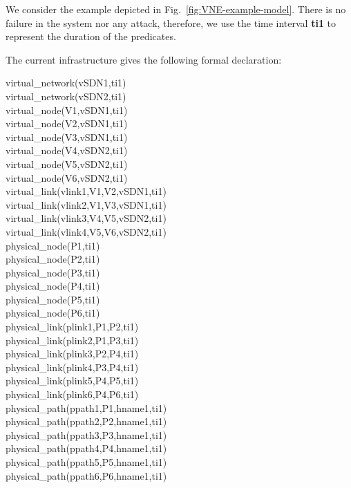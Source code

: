 We consider the example depicted in Fig.~\ref{fig:VNE-example-model}.
There is no failure in the system nor any attack, therefore, we use the time interval \textbf{ti1} to represent the duration of the predicates.



The current infrastructure gives the following formal declaration:


virtual\_network(vSDN1,ti1)\\
virtual\_network(vSDN2,ti1)\\
virtual\_node(V1,vSDN1,ti1)\\
virtual\_node(V2,vSDN1,ti1)\\
virtual\_node(V3,vSDN1,ti1)\\
virtual\_node(V4,vSDN2,ti1)\\
virtual\_node(V5,vSDN2,ti1)\\
virtual\_node(V6,vSDN2,ti1)\\
virtual\_link(vlink1,V1,V2,vSDN1,ti1)\\
virtual\_link(vlink2,V1,V3,vSDN1,ti1)\\
virtual\_link(vlink3,V4,V5,vSDN2,ti1)\\
virtual\_link(vlink4,V5,V6,vSDN2,ti1)\\
physical\_node(P1,ti1)\\
physical\_node(P2,ti1)\\
physical\_node(P3,ti1)\\
physical\_node(P4,ti1)\\
physical\_node(P5,ti1)\\
physical\_node(P6,ti1)\\
physical\_link(plink1,P1,P2,ti1)\\
physical\_link(plink2,P1,P3,ti1)\\
physical\_link(plink3,P2,P4,ti1)\\
physical\_link(plink4,P3,P4,ti1)\\
physical\_link(plink5,P4,P5,ti1)\\
physical\_link(plink6,P4,P6,ti1)\\
physical\_path(ppath1,P1,hname1,ti1)\\
physical\_path(ppath2,P2,hname1,ti1)\\
physical\_path(ppath3,P3,hname1,ti1)\\
physical\_path(ppath4,P4,hname1,ti1)\\
physical\_path(ppath5,P5,hname1,ti1)\\
physical\_path(ppath6,P6,hname1,ti1)\\

